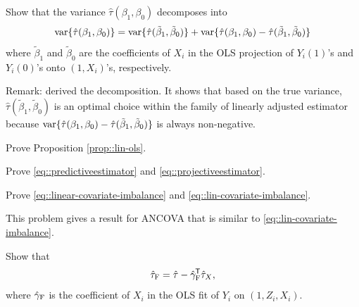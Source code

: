 \begin{HomeworkProblem}\label{exr:6-6}



Show that the variance $\hat{\tau}(\beta_1, \beta_0)$ decomposes into
\[
\textup{var}\{ \hat{\tau}(\beta_1, \beta_0) \}
=
\textup{var}\{ \hat{\tau}( \tilde{\beta}_1, \tilde{\beta}_0) \}
+
\textup{var}\{ \hat{\tau}(\beta_1, \beta_0) - \hat{\tau}(\tilde{\beta}_1, \tilde{\beta}_0) \}
\]
where $\tilde{\beta}_1$ and $\tilde{\beta}_0$ are the coefficients of $X_i$ in the OLS projection of $Y_i(1)$'s and $Y_i(0)$'s onto $(1, X_i)$'s, respectively.



Remark: \citet[][Example 9]{li2017general} derived the decomposition. It shows that based on the true variance, $\hat{\tau}( \tilde{\beta}_1, \tilde{\beta}_0)$ is an optimal choice within the family of linearly adjusted estimator because $\textup{var}\{ \hat{\tau}(\beta_1, \beta_0) - \hat{\tau}(\tilde{\beta}_1, \tilde{\beta}_0) \}$ is always non-negative.




\end{HomeworkProblem}

\begin{HomeworkProblem}\label{exr:6-7}

Prove Proposition \ref{prop::lin-ols}.

\end{HomeworkProblem}

\begin{HomeworkProblem}\label{exr:6-8}
Prove \eqref{eq::predictiveestimator} and \eqref{eq::projectiveestimator}.


\end{HomeworkProblem}

\begin{HomeworkProblem}\label{exr:6-9}

Prove \eqref{eq::linear-covariate-imbalance} and \eqref{eq::lin-covariate-imbalance}.



\end{HomeworkProblem}

\begin{HomeworkProblem}\label{exr:6-10}

This problem gives a result for ANCOVA that is similar to \eqref{eq::lin-covariate-imbalance}.

Show that
\[
\hat{\tau}_\textsc{F} =\hat\tau  - \hat\gamma_\textsc{F}^{\mkern-1.5mu\mathsf{T}} \hat\tau_X,
\]
where $ \hat\gamma_\textsc{F}$ is the coefficient of $X_i$ in the OLS fit of $Y_i$ on $(1,Z_i, X_i)$.





\end{HomeworkProblem}

